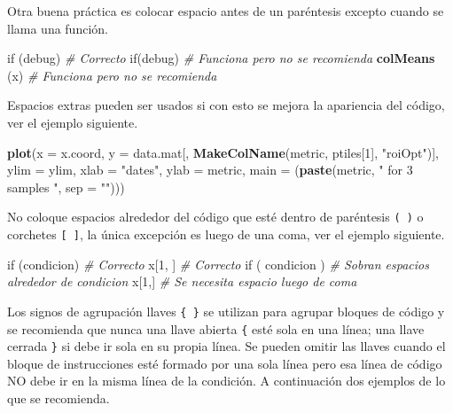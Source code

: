 \documentclass[10pt,]{krantz}
\makeatletter
\newenvironment{Shaded}{\begin{snugshade}}{\end{snugshade}}
\newcommand{\KeywordTok}[1]{\textcolor[rgb]{0.13,0.29,0.53}{\textbf{{#1}}}}
\newcommand{\DataTypeTok}[1]{\textcolor[rgb]{0.13,0.29,0.53}{{#1}}}
\newcommand{\DecValTok}[1]{\textcolor[rgb]{0.00,0.00,0.81}{{#1}}}
\newcommand{\StringTok}[1]{\textcolor[rgb]{0.31,0.60,0.02}{{#1}}}
\newcommand{\CommentTok}[1]{\textcolor[rgb]{0.56,0.35,0.01}{\textit{{#1}}}}
\newcommand{\NormalTok}[1]{{#1}}
\newenvironment{kframe}{%
\medskip{}
\setlength{\fboxsep}{.8em}
 \def\at@end@of@kframe{}%
 \ifinner\ifhmode%
  \def\at@end@of@kframe{\end{minipage}}%
  \begin{minipage}{\columnwidth}%
 \fi\fi%
 \def\FrameCommand##1{\hskip\@totalleftmargin \hskip-\fboxsep
 \colorbox{shadecolor}{##1}\hskip-\fboxsep
     \hskip-\linewidth \hskip-\@totalleftmargin \hskip\columnwidth}%
 \MakeFramed {\advance\hsize-\width
   \@totalleftmargin\z@ \linewidth\hsize
   \@setminipage}}%
 {\par\unskip\endMakeFramed%
 \at@end@of@kframe}
\renewenvironment{Shaded}{\begin{kframe}}{\end{kframe}}
\makeatother
\begin{document}
Otra buena práctica es colocar espacio antes de un paréntesis excepto
cuando se llama una función.

\begin{Shaded}
\begin{Highlighting}[]
\NormalTok{if (debug)    }\CommentTok{# Correcto}
\NormalTok{if(debug)     }\CommentTok{# Funciona pero no se recomienda}
\KeywordTok{colMeans} \NormalTok{(x)  }\CommentTok{# Funciona pero no se recomienda}
\end{Highlighting}
\end{Shaded}

Espacios extras pueden ser usados si con esto se mejora la apariencia
del código, ver el ejemplo siguiente.

\begin{Shaded}
\begin{Highlighting}[]
\KeywordTok{plot}\NormalTok{(}\DataTypeTok{x    =} \NormalTok{x.coord,}
     \DataTypeTok{y    =} \NormalTok{data.mat[, }\KeywordTok{MakeColName}\NormalTok{(metric, ptiles[}\DecValTok{1}\NormalTok{], }\StringTok{"roiOpt"}\NormalTok{)],}
     \DataTypeTok{ylim =} \NormalTok{ylim,}
     \DataTypeTok{xlab =} \StringTok{"dates"}\NormalTok{,}
     \DataTypeTok{ylab =} \NormalTok{metric,}
     \DataTypeTok{main =} \NormalTok{(}\KeywordTok{paste}\NormalTok{(metric, }\StringTok{" for 3 samples "}\NormalTok{, }\DataTypeTok{sep =} \StringTok{""}\NormalTok{)))}
\end{Highlighting}
\end{Shaded}

No coloque espacios alrededor del código que esté dentro de paréntesis
\texttt{(\ )} o corchetes \texttt{{[}\ {]}}, la única excepción es luego
de una coma, ver el ejemplo siguiente.

\begin{Shaded}
\begin{Highlighting}[]
\NormalTok{if (condicion)    }\CommentTok{# Correcto }
\NormalTok{x[}\DecValTok{1}\NormalTok{, ]            }\CommentTok{# Correcto}
\NormalTok{if ( condicion )  }\CommentTok{# Sobran espacios alrededor de condicion}
\NormalTok{x[}\DecValTok{1}\NormalTok{,]             }\CommentTok{# Se necesita espacio luego de coma}
\end{Highlighting}
\end{Shaded}

Los signos de agrupación llaves \texttt{\{\ \}} se utilizan para agrupar
bloques de código y se recomienda que nunca una llave abierta
\texttt{\{} esté sola en una línea; una llave cerrada \texttt{\}} si
debe ir sola en su propia línea. Se pueden omitir las llaves cuando el
bloque de instrucciones esté formado por una sola línea pero esa línea
de código NO debe ir en la misma línea de la condición. A continuación
dos ejemplos de lo que se recomienda.
\end{document}
